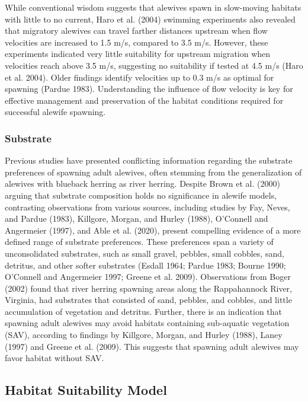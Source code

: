 \documentclass[
]{book}
\begin{document}
While conventional wisdom suggests that alewives spawn in slow-moving habitats with little to no current, Haro et al. (2004) swimming experiments also revealed that migratory alewives can travel farther distances upstream when flow velocities are increased to 1.5 m/s, compared to 3.5 m/s. However, these experiments indicated very little suitability for upstream migration when velocities reach above 3.5 m/s, suggesting no suitability if tested at 4.5 m/s (Haro et al. 2004). Older findings identify velocities up to 0.3 m/s as optimal for spawning (Pardue 1983). Understanding the influence of flow velocity is key for effective management and preservation of the habitat conditions required for successful alewife spawning.

\hypertarget{substrate}{%
\subsubsection{Substrate}\label{substrate}}

Previous studies have presented conflicting information regarding the substrate preferences of spawning adult alewives, often stemming from the generalization of alewives with blueback herring as river herring. Despite Brown et al. (2000) arguing that substrate composition holds no significance in alewife models, contrasting observations from various sources, including studies by Fay, Neves, and Pardue (1983), Killgore, Morgan, and Hurley (1988), O'Connell and Angermeier (1997), and Able et al. (2020), present compelling evidence of a more defined range of substrate preferences. These preferences span a variety of unconsolidated substrates, such as small gravel, pebbles, small cobbles, sand, detritus, and other softer substrates (Esdall 1964; Pardue 1983; Bourne 1990; O'Connell and Angermeier 1997; Greene et al. 2009). Observations from Boger (2002) found that river herring spawning areas along the Rappahannock River,
Virginia, had substrates that consisted of sand, pebbles, and cobbles, and little accumulation of vegetation and detritus. Further, there is an indication that spawning adult alewives may avoid habitats containing sub-aquatic vegetation (SAV), according to findings by Killgore, Morgan, and Hurley (1988), Laney (1997) and Greene et al. (2009). This suggests that spawning adult alewives may favor habitat without SAV.

\hypertarget{habitat-suitability-model}{%
\subsection{Habitat Suitability Model}\label{habitat-suitability-model}}
\end{document}
